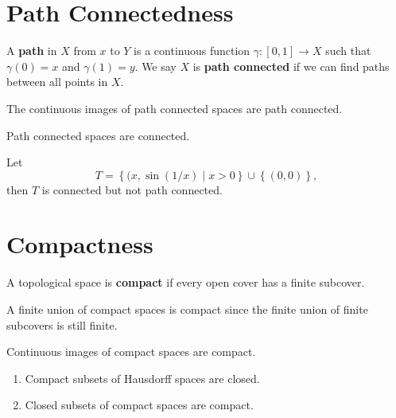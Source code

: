 \documentclass[twoside,10pt]{report}
\begin{document}
\newpage

\section{Path Connectedness}

\begin{defn}[]
	A \textbf{path} in $X$ from $x$ to $Y$ is a continuous function $\gamma:[0,1]\to X$ such that $\gamma(0)=x$ and $\gamma(1)=y$. We say $X$ is \textbf{path connected} if we can find paths between all points in $X$.
\end{defn}

\begin{prop}
The continuous images of path connected spaces are path connected.
\end{prop}

\begin{prop}
Path connected spaces are connected.
\end{prop}

\begin{ex}
Let
\[
	T = \left\{ (x,\sin(1/x) \;|\; x>0 \right\} \cup \left\{ (0,0) \right\},
\] then $T$ is connected but not path connected.
\end{ex}


\section{Compactness}

\begin{defn}[]
	A topological space is \textbf{compact} if every open cover has a finite subcover.
\end{defn}

A finite union of compact spaces is compact since the finite union of finite subcovers is still finite.

\begin{prop}
Continuous images of compact spaces are compact.
\end{prop}

\begin{prop}
	\begin{enumerate}
		\item Compact subsets of Hausdorff spaces are closed.
		\item Closed subsets of compact spaces are compact.
	\end{enumerate}
\end{prop}
\end{document}
